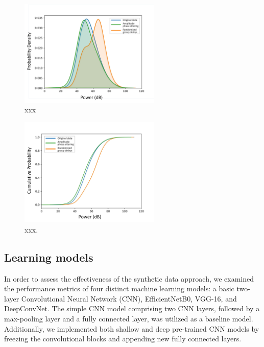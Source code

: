 \documentclass{article}
\begin{document}
\begin{figure}
\centering
    \includegraphics[width=0.6\textwidth]{Documents/pd.jpg}
    \caption{xxx}
    \label{tab:PD}

\end{figure}


\begin{figure}
\centering
    \includegraphics[width=0.6\textwidth]{Documents/cp.jpg}
    \caption{xxx.}
    \label{tab:CP}

\end{figure}

\subsection{Learning models}
In order to assess the effectiveness of the synthetic data approach, we examined the performance metrics of four distinct machine learning models: a basic two-layer Convolutional Neural Network (CNN), EfficientNetB0, VGG-16, and DeepConvNet. The simple CNN model comprising two CNN layers, followed by a max-pooling layer and a fully connected layer, was utilized as a baseline model. Additionally, we implemented both shallow and deep pre-trained CNN models by freezing the convolutional blocks and appending new fully connected layers.
\end{document}
